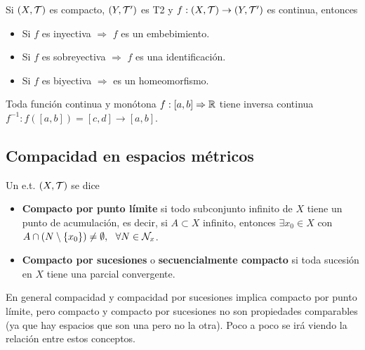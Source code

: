 \begin{coro}
    Si $(X, \mathcal{T})$ es compacto, $(Y, \mathcal{T}')$ es T2 y $f:(X, \mathcal{T})\to (Y, \mathcal{T}')$ es continua, entonces 
    \begin{itemize}
        \item Si $f$ es inyectiva $\Rightarrow$ $f$ es un embebimiento.
        \item Si $f$ es sobreyectiva $\Rightarrow$ $f$ es una identificación.
        \item Si $f$ es biyectiva $\Rightarrow$ es un homeomorfismo.
    \end{itemize}
    \endsquare
\end{coro}

\begin{ejemplo}
    Toda función continua y monótona $f:[a,b]\Rightarrow \mathbb{R}$ tiene inversa continua $f^{-1}:f([a,b])=[c,d] \to [a,b]$.
    \endsquare
\end{ejemplo}

\subsection{Compacidad en espacios métricos}

\begin{definicion}
    Un e.t. $(X, \mathcal{T})$ se dice
    \begin{itemize}
        \item \textbf{Compacto por punto límite} si todo subconjunto infinito de $X$ tiene un punto de acumulación, es decir, si $A\subset X$ infinito, entonces $\exists x_0\in X$ con $A\cap(N\setminus\{x_0\})\neq \emptyset,\ \ \forall N\in \cc{N}_x$.
        \item \textbf{Compacto por sucesiones} o \textbf{secuencialmente compacto} si toda sucesión en $X$ tiene una parcial convergente. 
    \end{itemize}
    \endsquare
\end{definicion}

En general compacidad y compacidad por sucesiones implica compacto por punto límite, pero compacto y compacto por sucesiones no son propiedades comparables (ya que hay espacios que son una pero no la otra). Poco a poco se irá viendo la relación entre estos conceptos.


